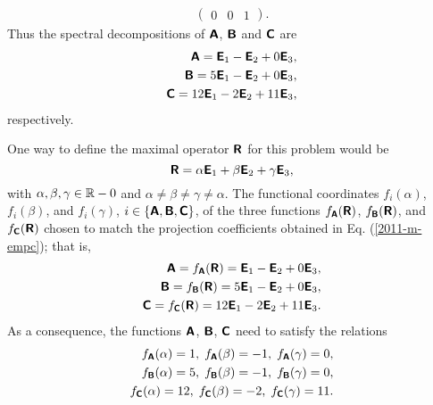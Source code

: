 {\begin{equation}
\begin{split}
\begin{pmatrix}
0& 0& 1
\end{pmatrix}.
\end{split}
\end{equation}
Thus the spectral decompositions of
$\textsf{\textbf{A}}$,
$\textsf{\textbf{B}}$  and
$\textsf{\textbf{C}}$ are
\begin{equation}
\begin{split}
\textsf{\textbf{A}}= \textsf{\textbf{E}}_1  - \textsf{\textbf{E}}_2  + 0  \textsf{\textbf{E}}_3,\\
\textsf{\textbf{B}}= 5\textsf{\textbf{E}}_1  - \textsf{\textbf{E}}_2  + 0 \textsf{\textbf{E}}_3,\\
\textsf{\textbf{C}}= 12\textsf{\textbf{E}}_1  -2 \textsf{\textbf{E}}_2  + 11\textsf{\textbf{E}}_3,
\end{split}
\label{2011-m-empc}
\end{equation}
respectively.


One way to define the  maximal operator  $\textsf{\textbf{R}}$ for this problem
would be
$$
\textsf{\textbf{R}} = \alpha \textsf{\textbf{E}}_1  + \beta \textsf{\textbf{E}}_2  + \gamma  \textsf{\textbf{E}}_3,
$$
with
$\alpha ,  \beta ,   \gamma \in {\Bbb R}-0$ and
$\alpha  \neq \beta  \neq   \gamma \neq \alpha  $.
The functional coordinates
$f_i(\alpha )$, $f_i(\beta)$, and $f_i(\gamma)$,
$i\in \{\textsf{\textbf{A}},\textsf{\textbf{B}},\textsf{\textbf{C}}\}$,  of the three functions
$ f_\textsf{\textbf{A}}(\textsf{\textbf{R}})$,
$ f_\textsf{\textbf{B}}(\textsf{\textbf{R}})$, and
$ f_\textsf{\textbf{C}}(\textsf{\textbf{R}})$
chosen to match the projection coefficients obtained in Eq. (\ref{2011-m-empc});
that is,
\begin{equation}
\begin{split}
\textsf{\textbf{A}}= f_\textsf{\textbf{A}}(\textsf{\textbf{R}})=  \textsf{\textbf{E}}_1  - \textsf{\textbf{E}}_2  + 0  \textsf{\textbf{E}}_3,\\
\textsf{\textbf{B}}=  f_\textsf{\textbf{B}}(\textsf{\textbf{R}})= 5\textsf{\textbf{E}}_1  - \textsf{\textbf{E}}_2  + 0 \textsf{\textbf{E}}_3,\\
\textsf{\textbf{C}}=  f_\textsf{\textbf{C}}(\textsf{\textbf{R}})= 12\textsf{\textbf{E}}_1  -2 \textsf{\textbf{E}}_2  + 11\textsf{\textbf{E}}_3.
\end{split}
\end{equation}
As a consequence, the functions
$\textsf{\textbf{A}}$,
$\textsf{\textbf{B}}$,
$\textsf{\textbf{C}}$ need to satisfy the relations
\begin{equation}
\begin{split}
f_\textsf{\textbf{A}}(\alpha ) =1,\; f_\textsf{\textbf{A}}(\beta ) =-1,\; f_\textsf{\textbf{A}}(\gamma ) =0,\\
f_\textsf{\textbf{B}}(\alpha ) =5,\; f_\textsf{\textbf{B}}(\beta ) =-1,\; f_\textsf{\textbf{B}}(\gamma ) =0,\\
f_\textsf{\textbf{C}}(\alpha ) =12,\; f_\textsf{\textbf{C}}(\beta ) =-2,\; f_\textsf{\textbf{C}}(\gamma ) =11.
\end{split}
\label{2011-m-empc-fsr}
\end{equation}

\eexample
}

